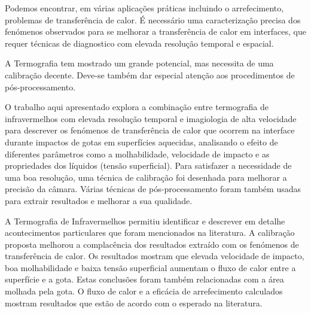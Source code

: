 \begin{resumo}

\par Podemos encontrar, em várias aplicações práticas incluindo o arrefecimento, problemas de transferência de calor. É necessário uma caracterização precisa dos fenómenos observados para se melhorar a transferência de calor em interfaces, que requer técnicas de diagnostico com elevada resolução temporal e espacial.

\par A Termografia tem mostrado um grande potencial, mas necessita de uma calibração decente. Deve-se também dar especial atenção aos procedimentos de pós-processamento.

\par O trabalho aqui apresentado explora a combinação entre termografia de infravermelhos com elevada resolução temporal e imagiologia de alta velocidade para descrever os fenómenos de transferência de calor que ocorrem na interface durante impactos de gotas em superfícies aquecidas, analisando o efeito de diferentes parâmetros como a molhabilidade, velocidade de impacto e as propriedades dos líquidos (tensão superficial). Para satisfazer a necessidade de uma boa resolução, uma técnica de calibração foi desenhada para melhorar a precisão da câmara. Várias técnicas de pós-processamento foram também usadas para extrair resultados e melhorar a sua qualidade. 

\par A Termografia de Infravermelhos permitiu identificar e descrever em detalhe acontecimentos particulares que foram mencionados na literatura. A calibração proposta melhorou a complacência dos resultados extraído com os fenómenos de transferência de calor. Os resultados mostram que elevada velocidade de impacto, boa molhabilidade e baixa tensão superficial aumentam o fluxo de calor entre a superfície e a gota. Estas conclusões foram também relacionadas com a área molhada pela gota. O fluxo de calor e a eficácia de arrefecimento calculados mostram resultados que estão de acordo com o esperado na literatura.

\end{resumo}